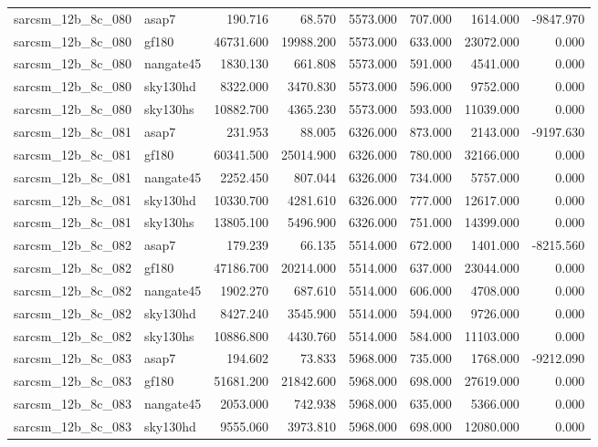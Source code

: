 \begin{tabular}{llrrrrrr}
sarcsm\_12b\_8c\_080 & asap7 & 190.716 & 68.570 & 5573.000 & 707.000 & 1614.000 & -9847.970 \\
sarcsm\_12b\_8c\_080 & gf180 & 46731.600 & 19988.200 & 5573.000 & 633.000 & 23072.000 & 0.000 \\
sarcsm\_12b\_8c\_080 & nangate45 & 1830.130 & 661.808 & 5573.000 & 591.000 & 4541.000 & 0.000 \\
sarcsm\_12b\_8c\_080 & sky130hd & 8322.000 & 3470.830 & 5573.000 & 596.000 & 9752.000 & 0.000 \\
sarcsm\_12b\_8c\_080 & sky130hs & 10882.700 & 4365.230 & 5573.000 & 593.000 & 11039.000 & 0.000 \\
sarcsm\_12b\_8c\_081 & asap7 & 231.953 & 88.005 & 6326.000 & 873.000 & 2143.000 & -9197.630 \\
sarcsm\_12b\_8c\_081 & gf180 & 60341.500 & 25014.900 & 6326.000 & 780.000 & 32166.000 & 0.000 \\
sarcsm\_12b\_8c\_081 & nangate45 & 2252.450 & 807.044 & 6326.000 & 734.000 & 5757.000 & 0.000 \\
sarcsm\_12b\_8c\_081 & sky130hd & 10330.700 & 4281.610 & 6326.000 & 777.000 & 12617.000 & 0.000 \\
sarcsm\_12b\_8c\_081 & sky130hs & 13805.100 & 5496.900 & 6326.000 & 751.000 & 14399.000 & 0.000 \\
sarcsm\_12b\_8c\_082 & asap7 & 179.239 & 66.135 & 5514.000 & 672.000 & 1401.000 & -8215.560 \\
sarcsm\_12b\_8c\_082 & gf180 & 47186.700 & 20214.000 & 5514.000 & 637.000 & 23044.000 & 0.000 \\
sarcsm\_12b\_8c\_082 & nangate45 & 1902.270 & 687.610 & 5514.000 & 606.000 & 4708.000 & 0.000 \\
sarcsm\_12b\_8c\_082 & sky130hd & 8427.240 & 3545.900 & 5514.000 & 594.000 & 9726.000 & 0.000 \\
sarcsm\_12b\_8c\_082 & sky130hs & 10886.800 & 4430.760 & 5514.000 & 584.000 & 11103.000 & 0.000 \\
sarcsm\_12b\_8c\_083 & asap7 & 194.602 & 73.833 & 5968.000 & 735.000 & 1768.000 & -9212.090 \\
sarcsm\_12b\_8c\_083 & gf180 & 51681.200 & 21842.600 & 5968.000 & 698.000 & 27619.000 & 0.000 \\
sarcsm\_12b\_8c\_083 & nangate45 & 2053.000 & 742.938 & 5968.000 & 635.000 & 5366.000 & 0.000 \\
sarcsm\_12b\_8c\_083 & sky130hd & 9555.060 & 3973.810 & 5968.000 & 698.000 & 12080.000 & 0.000 \\

\end{tabular}
